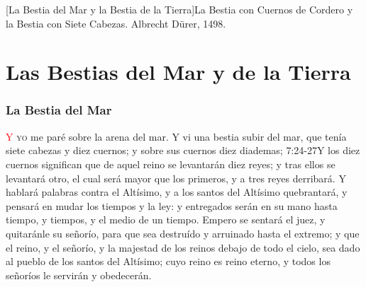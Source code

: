[La Bestia del Mar y la Bestia de la Tierra]{La Bestia con Cuernos de Cordero y la Bestia con Siete Cabezas. Albrecht Dürer, 1498.}

\chapter{Las Bestias del Mar y de la Tierra}
\subsection*{La Bestia del Mar}
\lettrine[lines=3,slope=-0.5em,loversize=0.1]{\textcolor{red}{Y}}{\hspace{0.5em} yo} me paré sobre la arena del mar. Y vi una bestia subir del mar, que tenía siete cabezas y diez cuernos; y sobre sus cuernos diez diademas;%
					   {7:24-27}{Y los diez cuernos significan que de aquel reino se levantarán diez reyes; y tras ellos se levantará otro, el cual será mayor que los primeros, y a tres reyes derribará. Y hablará palabras contra el Altísimo, y a los santos del Altísimo quebrantará, y pensará en mudar los tiempos y la ley: y entregados serán en su mano hasta tiempo, y tiempos, y el medio de un tiempo. Empero se sentará el juez, y quitaránle su señorío, para que sea destruído y arruinado hasta el extremo; y que el reino, y el señorío, y la majestad de los reinos debajo de todo el cielo, sea dado al pueblo de los santos del Altísimo; cuyo reino es reino eterno, y todos los señoríos le servirán y obedecerán.}

